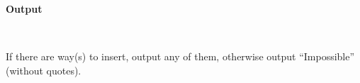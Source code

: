 \textbf{\textbf{Output }}
 

 

If there are way(s) to insert, output any of them, otherwise output “Impossible” (without quotes).

 

 